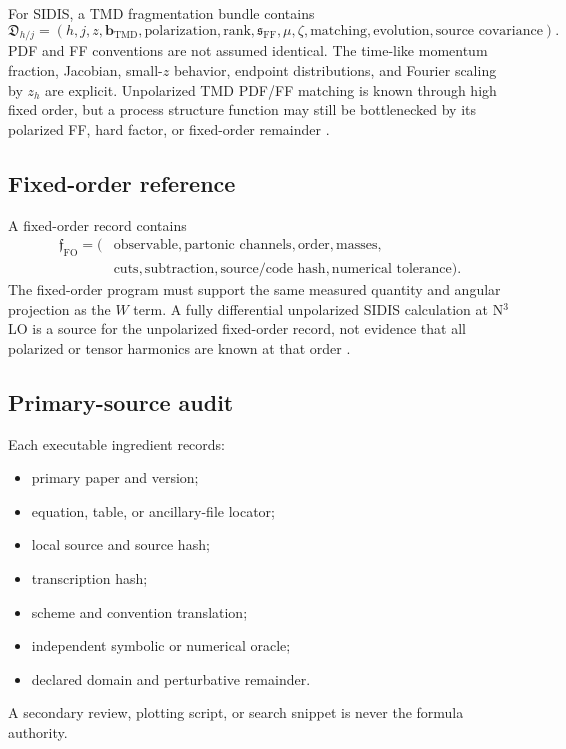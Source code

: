 \documentclass[11pt]{article}
\newcommand{\FF}{\mathrm{FF}}
\newcommand{\bM}{\bm b_{\mathrm{TMD}}}
\newcommand{\FO}{\mathrm{FO}}
\begin{document}
For SIDIS, a TMD fragmentation bundle contains
\begin{equation}
 \mathfrak D_{h/j}=
 \left(
 h,j,z,\bM,
 \text{polarization},
 \text{rank},
 \mathfrak s_{\FF},
 \mu,\zeta,
 \text{matching},
 \text{evolution},
 \text{source covariance}
 \right).
 \label{eq:ff-record}
\end{equation}
PDF and FF conventions are not assumed identical.  The time-like momentum fraction, Jacobian, small-\(z\) behavior, endpoint distributions, and Fourier scaling by \(z_h\) are explicit.  Unpolarized TMD PDF/FF matching is known through high fixed order, but a process structure function may still be bottlenecked by its polarized FF, hard factor, or fixed-order remainder \cite{LuoEtAl2020,ZhuHelicity2025,ZhuTransversity2025,ZhuLinearGluon2025}.

\subsection{Fixed-order reference}

A fixed-order record contains
\begin{equation}
\begin{aligned}
 \mathfrak f_{\FO}=\bigl(&
 \text{observable},
 \text{partonic channels},
 \text{order},
 \text{masses},\\
 &\text{cuts},
 \text{subtraction},
 \text{source/code hash},
 \text{numerical tolerance}
 \bigr).
\end{aligned}
 \label{eq:fo-record}
\end{equation}
The fixed-order program must support the same measured quantity and angular projection as the \(W\) term.  A fully differential unpolarized SIDIS calculation at N\(^3\)LO is a source for the unpolarized fixed-order record, not evidence that all polarized or tensor harmonics are known at that order \cite{DongEtAl2026}.

\subsection{Primary-source audit}

Each executable ingredient records:
\begin{itemize}
\item primary paper and version;
\item equation, table, or ancillary-file locator;
\item local source and source hash;
\item transcription hash;
\item scheme and convention translation;
\item independent symbolic or numerical oracle;
\item declared domain and perturbative remainder.
\end{itemize}
A secondary review, plotting script, or search snippet is never the formula authority.
\end{document}
